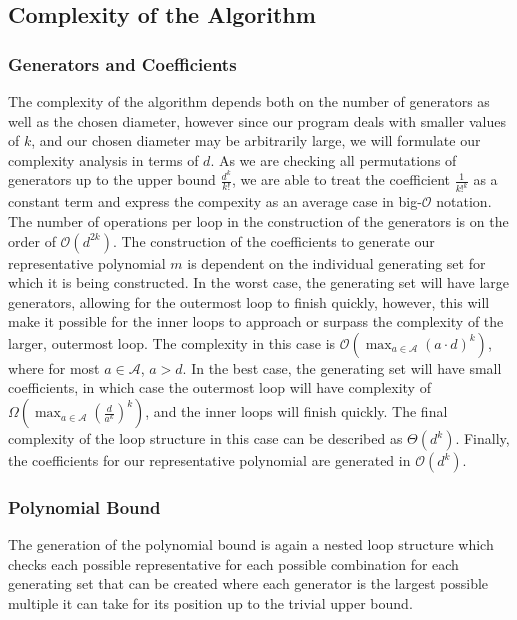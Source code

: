 \subsection{Complexity of the Algorithm}

\subsubsection{Generators and Coefficients}

The complexity of the algorithm depends both on the number of generators as well as the chosen diameter, however since our program deals with smaller values of $k$, and our chosen diameter may be arbitrarily large, we will formulate our complexity analysis in terms of $d$. As we are checking all permutations of generators up to the upper bound $\frac{d^k}{k!}$, we are able to treat the coefficient $\frac{1}{k!^{k}}$ as a constant term and express the compexity as an average case in big-$\mathcal{O}$ notation. The number of operations per loop in the construction of the generators is on the order of $\mathcal{O}(d^{2k})$. The construction of the coefficients to generate our representative polynomial $m$ is dependent on the individual generating set for which it is being constructed. In the worst case, the generating set will have large generators, allowing for the outermost loop to finish quickly, however, this will make it possible for the inner loops to approach or surpass the complexity of the larger, outermost loop. The complexity in this case is $\mathcal{O}(\max_{a \in \mathscr{A}}(a \cdot d)^k)$, where for most $a \in \mathscr{A}$, $a > d$. In the best case, the generating set will have small coefficients, in which case the outermost loop will have complexity of $\Omega(\max_{a \in \mathscr{A}} (\frac{d}{a^k})^k)$, and the inner loops will finish quickly. The final complexity of the loop structure in this case can be described as $\Theta(d^k)$. Finally, the coefficients for our representative polynomial are generated in $\mathcal{O}(d^k)$.

\subsubsection{Polynomial Bound}

The generation of the polynomial bound is again a nested loop structure which checks each possible representative for each possible combination for each generating set that can be created where each generator is the largest possible multiple it can take for its position up to the trivial upper bound.
